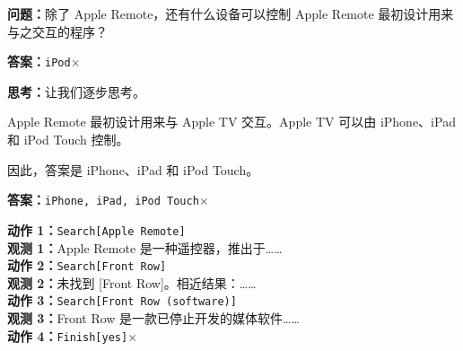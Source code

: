 \begingroup
\footnotesize
\linespread{1.05}\selectfont
{}
\newcommand{\chTenBad}{\hfill\textcolor{red!65}{\large$\times$}}
\newcommand{\chTenGood}{\hfill\tikz[baseline=-.4ex,x=1ex,y=1ex]{\draw[green!50!black,line width=1.2pt,line cap=round,line join=round] (0,.4)--(.35,0)--(1.1,1);}}
\newcommand{\chTenTool}[1]{\textcolor{blue!65!black}{\texttt{#1}}}
\begin{minipage}[t]{.485\linewidth}
\vspace{0pt}
\raggedright
\begin{tcolorbox}[chTenPanel]
\textbf{问题：}除了 Apple Remote，还有什么设备可以控制 Apple Remote 最初设计用来与之交互的程序？
\end{tcolorbox}
\begin{tcolorbox}[chTenPanel,title=标准方式]
\textbf{答案：}\texttt{iPod}\chTenBad
\end{tcolorbox}
\begin{tcolorbox}[chTenPanel,title=仅推理]
\textbf{思考：}让我们逐步思考。\par
\colorbox{red!20}{\parbox{\dimexpr\linewidth-2\fboxsep\relax}{Apple Remote 最初设计用来与 Apple TV 交互。Apple TV 可以由 iPhone、iPad 和 iPod Touch 控制。}}
\par\noindent 因此，答案是 iPhone、iPad 和 iPod Touch。

\smallskip
\textbf{答案：}\texttt{iPhone, iPad, iPod Touch}\chTenBad
\end{tcolorbox}
\begin{tcolorbox}[chTenPanel,title=仅行动]
\textbf{动作 1：}\chTenTool{Search[Apple Remote]}\\
\textbf{观测 1：}Apple Remote 是一种遥控器，推出于……\\
\textbf{动作 2：}\chTenTool{Search[Front Row]}\\
\textbf{观测 2：}未找到 [Front Row]。相近结果：……\\
\textbf{动作 3：}\chTenTool{Search[Front Row (software)]}\\
\textbf{观测 3：}Front Row 是一款已停止开发的媒体软件……\\
\textbf{动作 4：}\chTenTool{Finish[}\colorbox{red!20}{\texttt{yes}}\chTenTool{]}\chTenBad
\end{tcolorbox}
\end{minipage}\hfill

